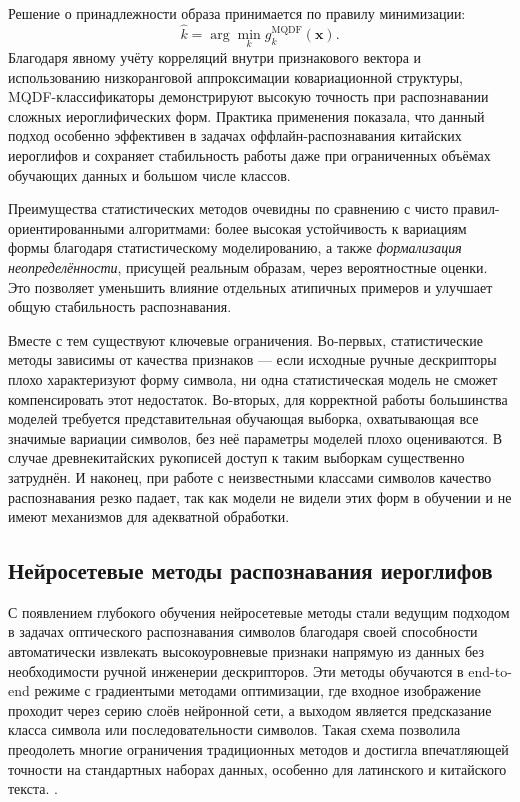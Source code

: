 Решение о принадлежности образа принимается по правилу минимизации:
\[
    \hat{k} =
    \arg\min_k
    g_k^{\mathrm{MQDF}}(\mathbf{x}).
\]
Благодаря явному учёту корреляций внутри признакового вектора и использованию низкоранговой аппроксимации ковариационной структуры, MQDF-классификаторы демонстрируют высокую точность при распознавании сложных иероглифических форм. Практика применения показала, что данный подход особенно эффективен в задачах оффлайн-распознавания китайских иероглифов и сохраняет стабильность работы даже при ограниченных объёмах обучающих данных и большом числе классов.

Преимущества статистических методов очевидны по сравнению с чисто правил-ориентированными алгоритмами: более высокая устойчивость к вариациям формы благодаря статистическому моделированию, а также \textit{формализация неопределённости}, присущей реальным образам, через вероятностные оценки. Это позволяет уменьшить влияние отдельных атипичных примеров и улучшает общую стабильность распознавания.

Вместе с тем существуют ключевые ограничения. Во-первых, статистические методы зависимы от качества признаков — если исходные ручные дескрипторы плохо характеризуют форму символа, ни одна статистическая модель не сможет компенсировать этот недостаток. Во-вторых, для корректной работы большинства моделей требуется представительная обучающая выборка, охватывающая все значимые вариации символов, без неё параметры моделей плохо оцениваются. В случае древнекитайских рукописей доступ к таким выборкам существенно затруднён. И наконец, при работе с неизвестными классами символов качество распознавания резко падает, так как модели не видели этих форм в обучении и не имеют механизмов для адекватной обработки.

\subsection{Нейросетевые методы распознавания иероглифов}
С появлением глубокого обучения нейросетевые методы стали ведущим подходом в задачах оптического распознавания символов благодаря своей способности автоматически извлекать высокоуровневые признаки напрямую из данных без необходимости ручной инженерии дескрипторов. Эти методы обучаются в end-to-end режиме с градиентыми методами оптимизации, где входное изображение проходит через серию слоёв нейронной сети, а выходом является предсказание класса символа или последовательности символов. Такая схема позволила преодолеть многие ограничения традиционных методов и достигла впечатляющей точности на стандартных наборах данных, особенно для латинского и китайского текста. \cite{xu2022sophisticated, yang2017improving, zhong2016handwritten, zhuang2021handwritten, coquenet2023faster}.

